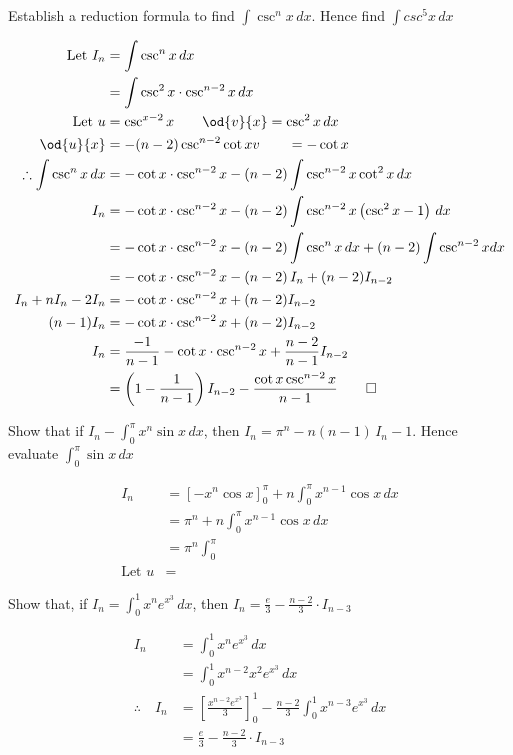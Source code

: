 	\begin{example}
		Establish a reduction formula to find $\int \csc^nx \, dx$. Hence find $\int csc^5x \, dx$
	\end{example}


	\begin{align*}
		\text{Let } I_n &= \int \csc^nx \, dx\\
		&= \int \csc^2x \cdot \csc^{n-2}x \, dx\\
		\text{Let } u & = \csc^{x-2} x              \qquad \od{v}{x} = \csc^2x \, dx \\
		\od{u}{x}     & = -(n-2)\csc^{n-2}\cot x  v \qquad = -\cot x                 \\
		\therefore \int \csc^nx \, dx &= -\cot x \cdot \csc^{n-2}x  - (n-2)\int \csc^{n-2}x\cot^2x \, dx\\
		I_n &= 	-\cot x \cdot \csc^{n-2}x - (n-2)\int \csc^{n-2}x\left(\csc^2x - 1\right) \, dx\\
		&= 		-\cot x \cdot \csc^{n-2}x - (n-2)\int \csc^{n}x\,dx + (n-2)\int\csc^{n-2}xdx\\
		&=-\cot x \cdot \csc^{n-2}x  - (n-2)\, I_n + (n-2)I_{n-2}\\
		I_n + nI_n -2I_n &= -\cot x\cdot \csc^{n-2}x  + (n-2)I_{n-2}\\
		(n-1)I_n &= -\cot x\cdot \csc^{n-2}x  + (n-2)I_{n-2}\\
		I_n &= \frac{-1}{n-1}-\cot x\cdot \csc^{n-2}x + \frac{n-2}{n-1}I_{n-2}\\
		&= \left(1-\frac{1}{n-1}\right)I_{n-2}-\frac{\cot x\csc^{n-2}x}{n-1}\qed
	\end{align*}
	\begin{example}
		Show that if $I_n - \int_0^\pi x^n\sin x\,dx$, then $I_n = \pi^n - n(n-1)\,I_n-1$. Hence evaluate $\int_0^\pi\sin x\,dx$
	\end{example}
	\begin{align*}
		I_n &=\left[-x^n\cos x\right]_0^\pi + n\int_0^\pi x^{n-1} \cos x \, dx\\
		&=\pi^n + n\int_0^\pi x^{n-1} \cos x \, dx\\
		&= \pi^n \int_0^\pi \\
		\text {Let } u &=
	\end{align*}
	\begin{example}
		Show that, if $I_n = \int_0^1 x^n e^{x^3} \, dx$, then $I_n =\frac{e}{3} - \frac{n-2}{3} \cdot I_{n-3}$
	\end{example}
	
	\begin{align*}
		I_n &= \int_0^1 x^n e^{x^3} \, dx\\
		&= \int_0^1 x^{n-2}x^2e^{x^3} \, dx\\
		\therefore \quad I_n &= \left[\frac{x^{n-2}e^{x^3}}3\right]_0^1 - \frac{n-2}3 \int_0^1 x^{n-3}{e^{x^3}} \, dx\\
		&= \frac{e}3 - \frac{n-2}3 \cdot I_{n-3}
	\end{align*}
	
